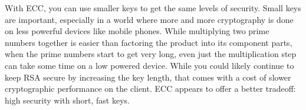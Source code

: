 With ECC, you can use smaller keys to get the same levels of security. Small keys are important, especially in a world where more and more cryptography is done on less powerful devices like mobile phones. While multiplying two prime numbers together is easier than factoring the product into its component parts, when the prime numbers start to get very long, even just the multiplication step can take some time on a low powered device. While you could likely continue to keep RSA secure by increasing the key length, that comes with a cost of slower cryptographic performance on the client. ECC appears to offer a better tradeoff: high security with short, fast keys.